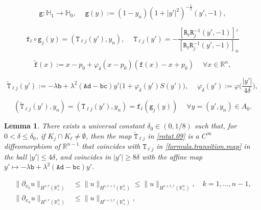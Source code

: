 \documentclass[10pt,a4paper]{amsart}
\newtheorem{lemma}{Lemma}
\newcommand{\R}{{\mathbb R}}
\renewcommand{\d}{\delta}
\newcommand{\lm}{\lambda}
\newcommand{\pa}{\partial}
\newcommand{\ph}{\varphi}
\begin{document}
\begin{equation} \label{explicit.mathtt.f.inv}
\mathtt g : \mathbb H_1 \to \mathbb H_0, \quad \ 
\mathtt g(y) := (1 - y_n) (1 + |y'|^2)^{-\frac12} (y', -1),
\end{equation}

\begin{equation}  \label{formula.transition.map}
\mathtt f_\ell \circ \mathtt g_j(y) = (\mathtt T_{\ell j}(y') , y_n), 
\quad \ 
\mathtt T_{\ell j}(y') 
= - \frac{[\mathtt R_\ell \mathtt R_j^{-1} (y', -1)]'}{[\mathtt R_\ell \mathtt R_j^{-1} (y', -1)]_n}
\end{equation}

\begin{equation} \label{def.tilde.mathtt.f}
\tilde{\mathtt f}(x) := 
x - p_0 + \ph_\delta(x-p_0) ( \mathtt f(x) - x + p_0 )
\quad \ \forall x \in \R^n,
\end{equation}

\begin{equation}  \label{rotat.09}
\tilde{\mathtt T}_{\ell j}(y') 
:= - \lm \mathtt b 
+ \lm^2 (\mathtt A \mathtt d - \mathtt b \mathtt c ) y' \big( 1 + \ph_\d(y') S(y') \big), 
\quad \ 
\ph_\d(y') := \ph \Big( \frac{|y'|}{4 \delta} \Big),
\end{equation}

\begin{equation} \label{extension.in.A0}
(\tilde{\mathtt T}_{\ell j}(y'), y_n) 
= (\mathtt T_{\ell j}(y'), y_n) 
= \mathtt f_\ell (\mathtt g_j(y)) 
\quad \ \forall y = (y', y_n) \in A_0.
\end{equation} 

\begin{lemma}  \label{lemma:rotat.tilde}
There exists a universal constant $\delta_0 \in (0, 1/8)$ such that, 
for $0 < \delta \leq \delta_0$, if $K_j \cap K_\ell \neq \emptyset$, then 
the map $\tilde{\mathtt T}_{\ell j}$ in \eqref{rotat.09}
is a $C^\infty$ diffeomorphism of $\R^{n-1}$ 
that coincides with $\mathtt T_{\ell j}$ in \eqref{formula.transition.map} 
in the ball $|y'| \leq 4 \delta$,
and coincides in $|y'| \geq 8 \delta$ with the affine map 
$y' \mapsto - \lm \mathtt b + \lm^2 (\mathtt A \mathtt d - \mathtt b \mathtt c ) y'$.
\end{lemma}

\begin{align} 
\| \pa_{x_k} u \|_{H^{s,r}(\R^n_+)} 
& \leq \| u \|_{H^{s,r+1}(\R^n_+)} 
\leq \| u \|_{H^{s+1,r}(\R^n_+)}, 
\quad k=1, \ldots, n-1,
\label{pa.k.est}
\\
\| \pa_{x_n} u \|_{H^{s,r}(\R^n_+)} 
& \leq \| u \|_{H^{s+1,r}(\R^n_+)},
\label{pa.n.est}
\end{align} 
\end{document}
